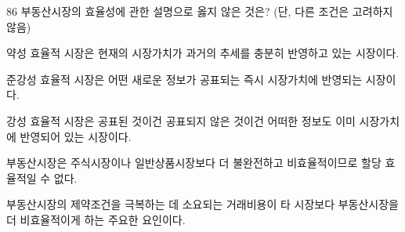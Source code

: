 \begin{question}{86}
부동산시장의 효율성에 관한 설명으로 옳지 않은 것은? (단, 다른 조건은 고려하지 않음)
\begin{choices}
  \item 약성 효율적 시장은 현재의 시장가치가 과거의 추세를 충분히 반영하고 있는 시장이다.
  \item 준강성 효율적 시장은 어떤 새로운 정보가 공표되는 즉시 시장가치에 반영되는 시장이다.
  \item 강성 효율적 시장은 공표된 것이건 공표되지 않은 것이건 어떠한 정보도 이미 시장가치에 반영되어 있는 시장이다.
  \item 부동산시장은 주식시장이나 일반상품시장보다 더 불완전하고 비효율적이므로 할당 효율적일 수 없다.
  \item 부동산시장의 제약조건을 극복하는 데 소요되는 거래비용이 타 시장보다 부동산시장을 더 비효율적이게 하는 주요한 요인이다.
\end{choices}
\end{question}
